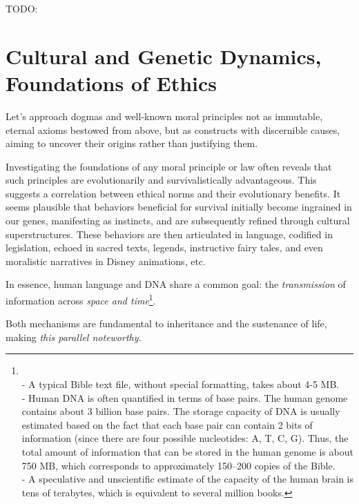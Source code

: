 \documentclass[11pt,a4]{article}
\begin{document}
    TODO:


\section{Cultural and Genetic Dynamics, Foundations of Ethics}

    Let's approach dogmas and well-known moral principles not as
    immutable, eternal axioms bestowed from above, but as constructs
    with discernible causes, aiming to uncover their origins rather than
    justifying them.
    \par
    Investigating the foundations of any moral principle or law often
    reveals that such principles are evolutionarily and survivalistically
    advantageous. This suggests a correlation between ethical
    norms and their evolutionary benefits. It seems plausible
    that behaviors beneficial for
    survival initially become ingrained in our genes, manifesting as
    instincts, and are subsequently refined through cultural superstructures.
    These behaviors are then articulated in language,
    codified in legislation, echoed in sacred texts, legends,
    instructive fairy tales, and even moralistic narratives in
    Disney animations, etc.

    \par
    In essence, human language and DNA share a common goal: the \textit{transmission} of information across \textit{space and time}\footnote{\\- A typical Bible text file, without special formatting, takes about 4-5 MB. \\
    - Human DNA is often quantified in terms of base pairs.
    The human genome contains about 3 billion base pairs.
    The storage capacity of DNA is usually estimated based on the
    fact that each base pair can contain
    2 bits of information (since there are four possible nucleotides: A, T, C, G).
    Thus, the total amount of information that can be stored in the human
    genome is about 750 MB, which corresponds to approximately 150–200 copies of
    the Bible.\\
    - A speculative and unscientific estimate of the capacity
    of the human brain is tens of terabytes, which is
    equivalent to several million books.}.

    \par
    Both mechanisms are fundamental to inheritance and
    the sustenance of life, making \textit{this parallel noteworthy.}
\end{document}
